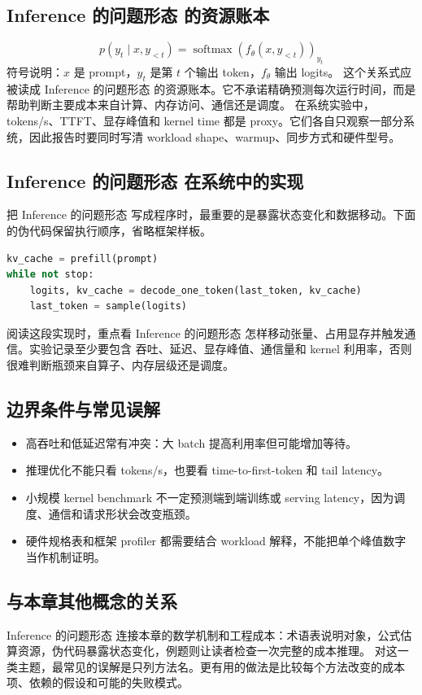 \documentclass[a4paper]{article}
\begin{document}
\subsection{Inference 的问题形态 的资源账本}
\[p(y_t\mid x,y_{<t})=\operatorname{softmax}(f_\theta(x,y_{<t}))_{y_t}\]
符号说明：\(x\) 是 prompt，\(y_t\) 是第 \(t\) 个输出 token，\(f_\theta\) 输出 logits。
这个关系式应被读成 Inference 的问题形态 的资源账本。它不承诺精确预测每次运行时间，而是帮助判断主要成本来自计算、内存访问、通信还是调度。
在系统实验中，tokens/s、TTFT、显存峰值和 kernel time 都是 proxy。它们各自只观察一部分系统，因此报告时要同时写清 workload shape、warmup、同步方式和硬件型号。
\subsection{Inference 的问题形态 在系统中的实现}
把 Inference 的问题形态 写成程序时，最重要的是暴露状态变化和数据移动。下面的伪代码保留执行顺序，省略框架样板。
\begin{lstlisting}[language=Python]
kv_cache = prefill(prompt)
while not stop:
    logits, kv_cache = decode_one_token(last_token, kv_cache)
    last_token = sample(logits)
\end{lstlisting}
阅读这段实现时，重点看 Inference 的问题形态 怎样移动张量、占用显存并触发通信。实验记录至少要包含 吞吐、延迟、显存峰值、通信量和 kernel 利用率，否则很难判断瓶颈来自算子、内存层级还是调度。
\subsection{边界条件与常见误解}
\begin{itemize}
\item 高吞吐和低延迟常有冲突：大 batch 提高利用率但可能增加等待。
\item 推理优化不能只看 tokens/s，也要看 time-to-first-token 和 tail latency。
\item 小规模 kernel benchmark 不一定预测端到端训练或 serving latency，因为调度、通信和请求形状会改变瓶颈。
\item 硬件规格表和框架 profiler 都需要结合 workload 解释，不能把单个峰值数字当作机制证明。
\end{itemize}
\subsection{与本章其他概念的关系}
Inference 的问题形态 连接本章的数学机制和工程成本：术语表说明对象，公式估算资源，伪代码暴露状态变化，例题则让读者检查一次完整的成本推理。
对这一类主题，最常见的误解是只列方法名。更有用的做法是比较每个方法改变的成本项、依赖的假设和可能的失败模式。
\end{document}
